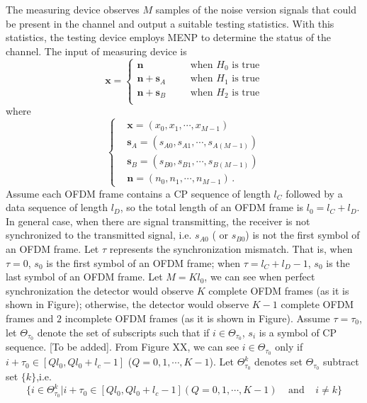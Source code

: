The measuring device observes $M$ samples of the noise version signals that could be present in the channel and output a suitable testing statistics. With this statistics, the testing device employs MENP to determine the status of the channel. The input of measuring device is
\begin{equation}
  \mathbf{x} = \begin{cases}
	\mathbf{n}\;\;\;\;\;\;&\text{when $H_0$ is true}\\
	\mathbf{n}+\mathbf{s}_A\;\;\;\;\;\;&\text{when $H_1$ is true}\\
	\mathbf{n}+\mathbf{s}_B\;\;\;\;\;\;&\text{when $H_2$ is true}\\
  \end{cases}
  \label{equ:1209a1}
\end{equation}
where 
\begin{equation}
  \begin{cases}
	&\mathbf{x} = (x_0, x_1, \cdots, x_{M-1})\\
	&\mathbf{s}_A = (s_{A0}, s_{A1}, \cdots, s_{A(M-1)})\\
	&\mathbf{s}_B = (s_{B0}, s_{B1}, \cdots, s_{B(M-1)})\\
	&\mathbf{n} = (n_{0}, n_{1}, \cdots, n_{M-1})\,.
  \end{cases}
  \label{xssn}
\end{equation}
Assume each OFDM frame contains a CP sequence of length $l_C$ followed by a data sequence of length $l_D$, so the total length of an OFDM frame is $l_0 = l_C+l_D$. In general case, when there are signal transmitting, the receiver is not synchronized to the transmitted signal, i.e. $s_{A0}$ ( or $s_{B0}$) is not the first symbol of an OFDM frame. Let $\tau$ represents the synchronization mismatch. That is, when $\tau = 0$, $s_0$ is the first symbol of an OFDM frame; when $\tau = l_C+l_D -1$, $s_0$ is the last symbol of an OFDM frame. Let $M = Kl_0$, we can see when perfect synchronization the detector would observe $K$ complete  OFDM frames (as it is shown in Figure); otherwise, the detector would observe $K-1$ complete OFDM frames and $2$ incomplete OFDM frames (as it is shown in Figure). 
Assume $\tau = \tau_0$, let $\Theta_{\tau_0}$ denote the set of subscripts such that if $i \in \Theta_{\tau_0}$,  $s_i$ is a symbol of CP sequence. [To be added].
From Figure XX, we can see $i \in \Theta_{\tau_0}$ only if $i + \tau_0 \in [Ql_0, Ql_0+l_c -1]$ ($Q = 0, 1, \cdots, K-1$). 
Let $\Theta_{\tau_0}^k$ denotes set $\Theta_{\tau_0}$ subtract set $\{k\}$,i.e.
\begin{equation}
  \{i\in \Theta_{\tau_0}^k| i + \tau_0 \in [Ql_0, Ql_0+l_c -1] (Q = 0, 1, \cdots, K-1)\;\;\;\; \text{and}\;\;\;\; i\neq k\}
  \label{definitionof}
\end{equation}

